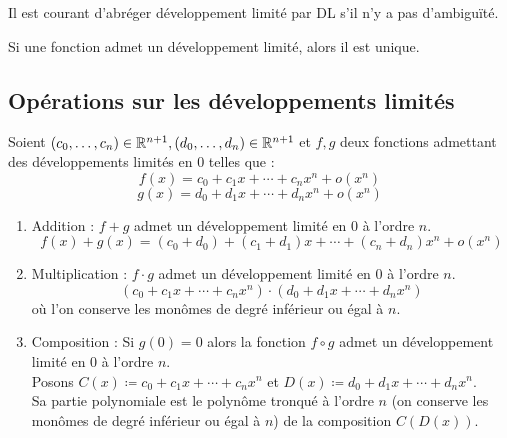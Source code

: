\begin{remark}
    Il est courant d'abréger développement limité par DL s'il n'y a pas d'ambiguïté.
\end{remark}

\begin{proposition}
    Si une fonction admet un développement limité, alors il est unique.
\end{proposition}

\subsection{Opérations sur les développements limités}
\begin{proposition}
    Soient $(c_0, \ldots, c_n) \in \mathbb{R}^{n+1}, (d_0, \ldots, d_n) \in \mathbb{R}^{n+1}$ et $f, g$ deux fonctions admettant des développements limités en 0 telles que :
    \[ f(x) = c_0 + c_1x + \cdots + c_n x^n + o(x^n) \]
    \[ g(x) = d_0 + d_1x + \cdots + d_n x^n + o(x^n) \]
    \begin{enumerate}
        \item Addition : $f + g$ admet un développement limité en 0 à l'ordre $n$.
        \[ f(x) + g(x) = (c_0 + d_0) + (c_1 + d_1)x + \cdots + (c_n + d_n) x^n + o(x^n) \]
        \item Multiplication : $f \cdot g$ admet un développement limité en 0 à l'ordre $n$.
        \[ (c_0 + c_1 x + \cdots + c_n x^n) \cdot (d_0 + d_1 x + \cdots + d_n x^n) \]
        où l'on conserve les monômes de degré inférieur ou égal à $n$.
        \item Composition : Si $g(0) = 0$ alors la fonction $f \circ g$ admet un développement limité en 0 à l'ordre $n$.\\
        Posons $C(x) \coloneqq c_0 + c_1x + \cdots + c_n x^n$ et $D(x) \coloneqq d_0 + d_1x + \cdots + d_n x^n$.\\
        Sa partie polynomiale est le polynôme tronqué à l'ordre $n$ (on conserve les monômes de degré inférieur ou égal à $n$) de la composition $C(D(x))$. 
    \end{enumerate}
\end{proposition}
